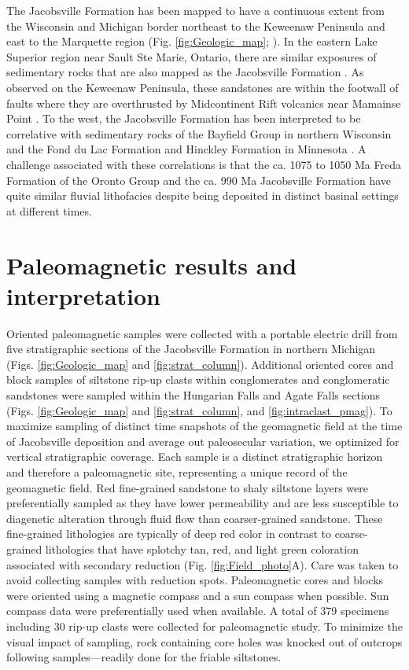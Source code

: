 \documentclass[draft]{agujournal2019}
\begin{document}
The Jacobsville Formation has been mapped to have a continuous extent from the Wisconsin and Michigan border northeast to the Keweenaw Peninsula and east to the Marquette region (Fig. \ref{fig:Geologic_map}; ). In the eastern Lake Superior region near Sault Ste Marie, Ontario, there are similar exposures of sedimentary rocks that are also mapped as the Jacobsville Formation \cite{Hamblin1958a}. As observed on the Keweenaw Peninsula, these sandstones are within the footwall of faults where they are overthrusted by Midcontinent Rift volcanics near Mamainse Point \cite{Manson1994a}. To the west, the Jacobsville Formation has been interpreted to be correlative with sedimentary rocks of the Bayfield Group in northern Wisconsin and the Fond du Lac Formation and Hinckley Formation in Minnesota \cite{Hamblin1958a, Kalliokoski1982a, Ojakangas2001b}. A challenge associated with these correlations is that the ca. 1075 to 1050 Ma Freda Formation of the Oronto Group and the ca. 990 Ma Jacobsville Formation have quite similar fluvial lithofacies despite being deposited in distinct basinal settings at different times.

\section*{Paleomagnetic results and interpretation}

Oriented paleomagnetic samples were collected with a portable electric drill from five stratigraphic sections of the Jacobsville Formation in northern Michigan (Figs. \ref{fig:Geologic_map} and \ref{fig:strat_column}). Additional oriented cores and block samples of siltstone rip-up clasts within conglomerates and conglomeratic sandstones were sampled within the Hungarian Falls and Agate Falls sections (Figs. \ref{fig:Geologic_map} and \ref{fig:strat_column}, and \ref{fig:intraclast_pmag}). To maximize sampling of distinct time snapshots of the geomagnetic field at the time of Jacobsville deposition and average out paleosecular variation, we optimized for vertical stratigraphic coverage. Each sample is a distinct stratigraphic horizon and therefore a paleomagnetic site, representing a unique record of the geomagnetic field. Red fine-grained sandstone to shaly siltstone layers were preferentially sampled as they have lower permeability and are less susceptible to diagenetic alteration through fluid flow than coarser-grained sandstone. These fine-grained lithologies are typically of deep red color in contrast to coarse-grained lithologies that have splotchy tan, red, and light green coloration associated with secondary reduction (Fig. \ref{fig:Field_photo}A). Care was taken to avoid collecting samples with reduction spots. Paleomagnetic cores and blocks were oriented using a magnetic compass and a sun compass when possible. Sun compass data were preferentially used when available. A total of 379 specimens including 30 rip-up clasts were collected for paleomagnetic study. To minimize the visual impact of sampling, rock containing core holes was knocked out of outcrops following samples---readily done for the friable siltstones.
\end{document}

